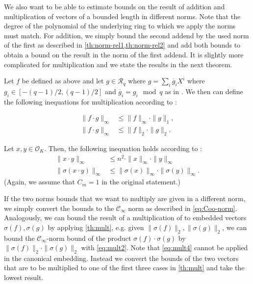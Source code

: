 We also want to be able to estimate bounds on the result of addition and multiplication of vectors of a bounded length in different norms. Note that the degree of the polynomial of the underlying ring to which we apply the norms must match. For addition, we simply bound the second addend by the used norm of the first as described in \cref{th:norm-rel1,th:norm-rel2} and add both bounds to obtain a bound on the result in the norm of the first addend. It is slightly more complicated for multiplication and we state the results in the next theorem.

\begin{theorem}\label{th:mult}
    Let $f$ be defined as above and let $g \in \mathcal{R}_q$ where $g = \sum_i \overline{g}_i X^i$ where $g_i \in \left[-(q-1)/2, (q-1)/2\right]$ and $\overline{g}_i = g_i \mod q$ as in \cite{BDLOP18}. We then can define the following inequations for multiplication according to \cite{BDLOP18}:

    \begin{align}
        \|f \cdot g\|_\infty & \leq \|f\|_\infty \cdot \|g\|_1, \label{eq:mult1} \\
        \|f \cdot g\|_\infty & \leq \|f\|_2 \cdot \|g\|_2 \label{eq:mult2}.
    \end{align}

    Let $x, y \in \mathcal{O}_K$. Then, the following inequation holds according to \cite{DPSZ12}:
    \begin{align}
        \| x \cdot y \|_\infty         & \leq n^2 \cdot \| x \|_\infty \cdot \| y \|_\infty   \label{eq:mult3}       \\
        \| \sigma(x \cdot y) \|_\infty & \leq  \| \sigma(x) \|_\infty \cdot \| \sigma(y) \|_\infty. \label{eq:mult4}
    \end{align}
    (Again, we assume that $C_m = 1$ in the original statement.)
\end{theorem}

If the two norms bounds that we want to multiply are given in a different norm, we simply convert the bounds to the $\mathcal{C}_\infty$ norm as described in \cref{eq:Coo-norm}. Analogously, we can bound the result of a multiplication of to embedded vectors $\sigma(f), \sigma(g)$ by applying \cref{th:mult}, e.g. given $\|\sigma(f)\|_2, \|\sigma(g)\|_2$, we can bound the $\mathcal{C}_\infty$-norm bound of the product $\sigma(f) \cdot \sigma(g)$ by $\|\sigma(f)\|_2 \cdot \|\sigma(g)\|_2$ with \cref{eq:mult2}. Note that \cref{eq:mult4} cannot be applied in the canonical embedding. Instead we convert the bounds of the two vectors that are to be multiplied to one of the first three cases in \cref{th:mult} and take the lowest result.


